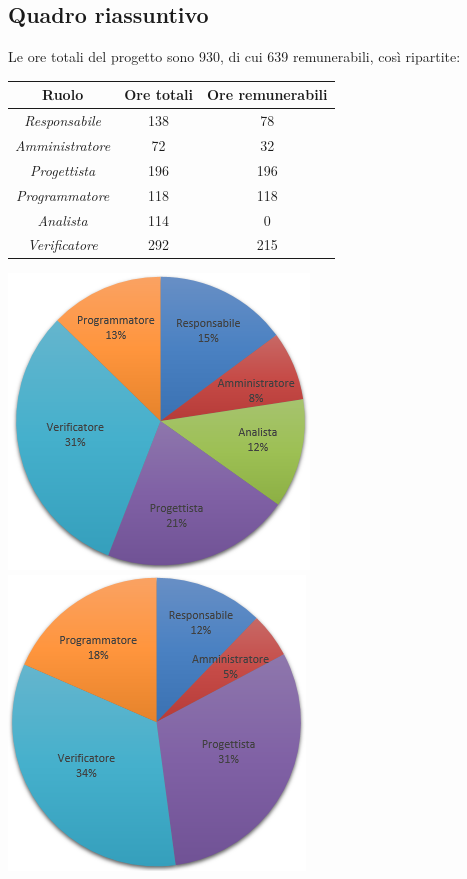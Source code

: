\subsection{Quadro riassuntivo}
Le ore totali del progetto sono 930, di cui 639 remunerabili, così ripartite:
\begin{center}
  \centering
  \begin{tabular}{|c|c|c|}
    \hline
    \textbf{Ruolo} & \textbf{Ore totali} & \textbf{Ore remunerabili} \\
    \hline
     \emph{Responsabile}  & 138 & 78 \\
    \hline  \emph{Amministratore}  & 72 & 32 \\
    \hline  \emph{Progettista}  & 196 & 196 \\
    \hline  \emph{Programmatore}  & 118 & 118 \\
    \hline  \emph{Analista}  & 114 & 0 \\
    \hline  \emph{Verificatore}  & 292 & 215 \\
    \hline
  \end{tabular}
  \includegraphics[scale=0.7]{img/grafico7.png}
  \includegraphics[scale=0.7]{img/grafico8.png}
\end{center}

